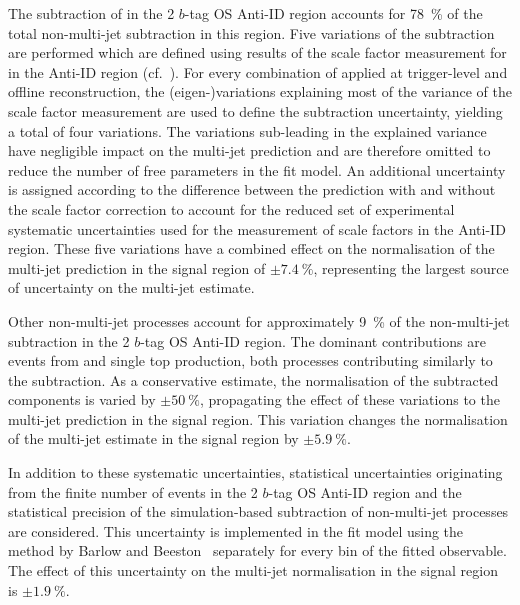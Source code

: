 The subtraction of \ttbarFakes in the 2 $b$-tag OS Anti-ID region
accounts for \SI{78}{\percent} of the total non-multi-jet subtraction
in this region. Five variations of the subtraction are performed which
are defined using results of the scale factor measurement for
\ttbarFakes in the Anti-ID region (cf.\
). %
For every combination of \tauid applied at trigger-level and offline
\tauhadvis reconstruction, the (eigen-)variations explaining most of
the variance of the scale factor measurement are used to define the
\ttbarFakes subtraction uncertainty, yielding a total of four
variations. The variations sub-leading in the explained variance have
negligible impact on the multi-jet prediction and are therefore
omitted to reduce the number of free parameters in the fit model. An
additional uncertainty is assigned according to the difference between
the \ttbarFakes prediction with and without the scale factor
correction to account for the reduced set of experimental systematic
uncertainties used for the measurement of \ttbarFakes scale factors in
the Anti-ID region. These five variations have a combined effect on
the normalisation of the multi-jet prediction in the signal region of
$\pm\SI{7.4}{\percent}$, representing the largest source of uncertainty on
the multi-jet estimate.

Other non-multi-jet processes account for approximately
\SI{9}{\percent} of the non-multi-jet subtraction in the 2 $b$-tag OS
Anti-ID region. The dominant contributions are events from \Vjets and
single top production, both processes contributing similarly to the
subtraction. As a conservative estimate, the normalisation of the
subtracted components is varied by $\pm \SI{50}{\percent}$,
propagating the effect of these variations to the multi-jet prediction
in the signal region. This variation changes the normalisation of the
multi-jet estimate in the signal region by $\pm\SI{5.9}{\percent}$.

In addition to these systematic uncertainties, statistical
uncertainties originating from the finite number of events in the 2
$b$-tag OS Anti-ID region and the statistical precision of the
simulation-based subtraction of non-multi-jet processes are
considered. This uncertainty is implemented in the fit model using the
method by Barlow and Beeston~\cite{barlow1993,conway2011} separately
for every bin of the fitted observable. The effect of this uncertainty
on the multi-jet normalisation in the signal region is
$\pm \SI{1.9}{\percent}$.

